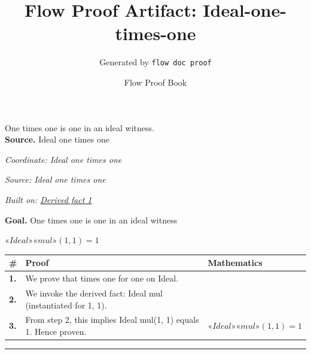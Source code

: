 \documentclass[11pt]{article}
\title{Flow Proof Artifact: Ideal-one-times-one}
\author{Generated by \texttt{flow doc proof}}
\date{Flow Proof Book}
\theoremstyle{definition}
\begin{document}
\maketitle
One times one is one in an ideal witness.\\[0.5em]
\textbf{Source.} Ideal one times one\\[0.5em]
\bigskip
{}\par
\smallskip\noindent\textit{Coordinate: Ideal \cdot one \cdot times one}\par
\smallskip\noindent\textit{Source: Ideal one times one}\par
\smallskip\noindent\textit{Built on: \hyperref[thm:Ideal-one-times_one]{Derived fact 1}}\par
\medskip
\noindent\textbf{Goal.} One times one is one in an ideal witness\par
\noindent$\displaystyle «Ideal» «mul»(1, 1) = 1$\par
\medskip
\noindent
\begin{tabular}{@{} >{\raggedright\arraybackslash}p{} >{\raggedright\arraybackslash}p{} >{\raggedleft\arraybackslash}p{} @{}}
\textbf{\#} & \textbf{Proof} & \textbf{Mathematics} \\
\midrule
\textbf{1.} & We prove that times one for one on Ideal. & \\[0.45em]
\textbf{2.} & We invoke the derived fact: \guillemotleft{}Ideal\guillemotright{} \guillemotleft{}mul\guillemotright{} (instantiated for 1, 1). & \\[0.45em]
\textbf{3.} & From step 2, this implies \guillemotleft{}Ideal\guillemotright{} \guillemotleft{}mul\guillemotright{}(1, 1) equals 1. Hence proven. & $\displaystyle «Ideal» «mul»(1, 1) = 1$ \\[0.45em]
\bottomrule
\end{tabular}
\label{thm:Ideal-one-times_one}
\par\medskip\hrule
\end{document}

